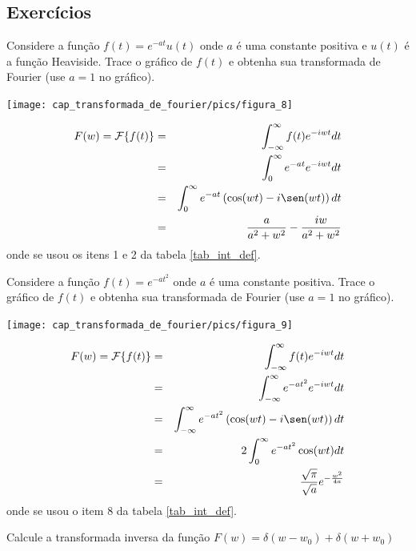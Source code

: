 \subsection*{Exercícios}
\begin{exer}{\label{transf_exp_heav}} Considere a função $f(t)=e^{-at}u(t)$ onde $a$ é uma constante positiva e $u(t)$ é a função Heaviside. Trace o gráfico de $f(t)$ e obtenha sua transformada de Fourier  (use $a=1$ no gráfico).
\end{exer}
\begin{resp}
\begin{center}
\texttt{[image: cap\_transformada\_de\_fourier/pics/figura\_8]}\end{center}
\begin{eqnarray*}
F(w)=\mathcal{F}\{f(t)\}&=&\int_{-\infty}^\infty f(t) e^{-i w t}dt\\
&=&\int_{0}^\infty e^{-at} e^{-i w t}dt\\
&=&\int_{0}^\infty e^{-at} \left(\cos(wt)-i\sen(wt)\right)dt\\
&=&\frac{a}{a^2+w^2}-\frac{iw}{a^2+w^2}\\
\end{eqnarray*}
onde se usou os itens 1 e 2 da tabela \ref{tab_int_def}.
\end{resp}
\begin{exer}{\label{Exer_trans_exp_t2}} Considere a função $f(t)=e^{-at^2}$ onde $a$ é uma constante positiva. Trace o gráfico de $f(t)$ e obtenha sua transformada de Fourier (use $a=1$ no gráfico).
\end{exer}
\begin{resp}
\begin{center}
\texttt{[image: cap\_transformada\_de\_fourier/pics/figura\_9]}\end{center}
\begin{eqnarray*}
F(w)=\mathcal{F}\{f(t)\}&=&\int_{-\infty}^\infty f(t) e^{-i w t}dt\\
&=&\int_{-\infty}^\infty e^{-at^2} e^{-i w t}dt\\
&=&\int_{-\infty}^\infty e^{-at^2} \left(\cos(wt)-i\sen(wt)\right)dt\\
&=&2\int_{0}^\infty e^{-at^2} \cos(wt)dt\\
&=&\frac{\sqrt{\pi}}{\sqrt{a}}e^{-\frac{w^2}{4a}}
\end{eqnarray*}
onde se usou o item 8 da tabela \ref{tab_int_def}.
\end{resp}
\begin{exer} {\label{ex_trans_Fou_0}}Calcule a transformada inversa da função $F(w)=\delta(w-w_0)+\delta(w+w_0)$
\end{exer}
